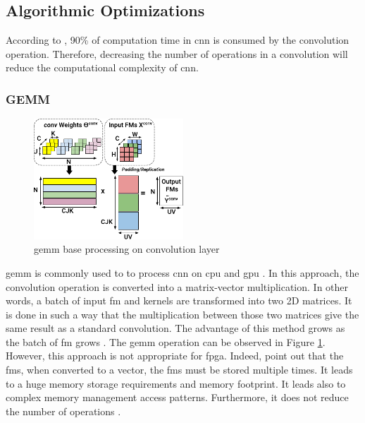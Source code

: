 \subsection{Algorithmic Optimizations} \label{subsec:algopti}
According to \textcite{shawahna_fpga-based_2019}, 90\% of computation time in \acrshort{cnn} is consumed by the convolution operation. Therefore, decreasing the number of operations in a convolution will reduce the computational complexity of \acrshort{cnn}.
%
%
\subsubsection{GEMM}
%
%
\begin{figure}
    \centering
    \includegraphics[width=0.5\textwidth]{Images/gemm.pdf}
    \caption{\acrshort{gemm} base processing on convolution layer \cite{abdelouahab_accelerating_2018}}
    \label{fig:gemm}
\end{figure}
%
\acrfull{gemm} is commonly used to to process \acrshort{cnn} on \acrshort{cpu} and \acrshort{gpu} \cite{abdelouahab_accelerating_2018}. In this approach, the convolution operation is converted into a matrix-vector multiplication. In other words, a batch of input \acrshort{fm} and kernels are transformed into two 2D matrices. It is done in such a way that the multiplication between those two matrices give the same result as a standard convolution. The advantage of this method grows as the batch of \acrshort{fm} grows \cite{abdelouahab_accelerating_2018}. The \acrshort{gemm} operation can be observed in Figure \ref{fig:gemm}. However, this approach is not appropriate for \acrshort{fpga}. Indeed, \textcite{sze_efficient_2017, zhu_efficient_2020} point out that the \acrshort{fm}s, when converted to a vector, the \acrshort{fm}s must be stored multiple times. It leads to a huge memory storage requirements and memory footprint. It leads also to complex memory management access patterns. Furthermore, it does not reduce the number of operations \cite{liang_evaluating_2020}.
%
%
